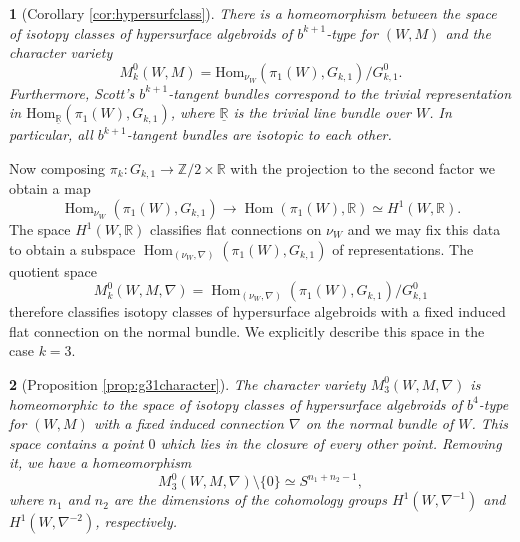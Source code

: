 \documentclass[10pt]{amsart}
\newcommand{\Hom}{\operatorname{Hom}}
\newcommand{\rr}{\mathbb{R}}
\numberwithin{theoremalpha}{section}
\numberwithin{equation}{section}
\numberwithin{definition}{section}
\numberwithin{theorem}{section}
\numberwithin{proposition}{section}
\numberwithin{lemma}{section}
\numberwithin{example}{section}
\numberwithin{remark}{section}
\numberwithin{corollary}{section}
\numberwithin{question}{section}
\numberwithin{problem}{section}
\numberwithin{assumption}{section}
\theoremstyle{named}
\newtheorem*{namedtheorem}{}
\numberwithin{equation}{section}
\begin{document}
\begin{namedtheorem}[Corollary \ref{cor:hypersurfclass}]
There is a homeomorphism between the space of isotopy classes of hypersurface algebroids of $b^{k+1}$-type for $(W, M)$ and the character variety 
\[
M^0_{k}(W,M) = \mathrm{Hom}_{\nu_W}(\pi_{1}(W), G_{k,1})/G_{k,1}^0.
\]
Furthermore, Scott's $b^{k+1}$-tangent bundles correspond to the trivial representation in $ \mathrm{Hom}_{\underline{\mathbb{R}}}(\pi_{1}(W), G_{k,1})$, where $\underline{\mathbb{R}}$ is the trivial line bundle over $W$. In particular, all $b^{k+1}$-tangent bundles are isotopic to each other. 
\end{namedtheorem}
Now composing $\pi_k : G_{k,1} \rightarrow \mathbb{Z}/2 \times \rr$ with the projection to the second factor we obtain a map
\begin{equation*}
\Hom_{\nu_W}(\pi_1(W),G_{k,1}) \rightarrow \Hom(\pi_1(W),\rr) \simeq H^1(W,\mathbb{R}).
\end{equation*}
The space $H^1(W,\mathbb{R})$ classifies flat connections on $\nu_W$ and we may fix this data to obtain a subspace $\Hom_{(\nu_W,\nabla)}(\pi_1(W),G_{k,1})$ of representations. The quotient space \[ M_{k}^0(W,M,\nabla) = \Hom_{(\nu_W,\nabla)}(\pi_1(W),G_{k,1})/G_{k,1}^0\] therefore classifies isotopy classes of hypersurface algebroids with a fixed induced flat connection on the normal bundle. We explicitly describe this space in the case $k = 3$. 
\begin{namedtheorem}[Proposition \ref{prop:g31character}]
The character variety $M_{3}^0(W,M,\nabla)$ is homeomorphic to the space of isotopy classes of hypersurface algebroids of $b^4$-type for $(W,M)$ with a fixed induced connection $\nabla$ on the normal bundle of $W$. This space contains a point $0$ which lies in the closure of every other point. Removing it, we have a homeomorphism  
\begin{equation*}
M_{3}^0(W,M,\nabla) \setminus \{ 0 \} \simeq S^{n_1 + n_2 - 1},
\end{equation*}
where $n_{1}$ and $n_{2}$ are the dimensions of the cohomology groups $H^{1}(W, \nabla^{-1})$ and $H^{1}(W, \nabla^{-2})$, respectively. 
\end{namedtheorem}
\end{document}
